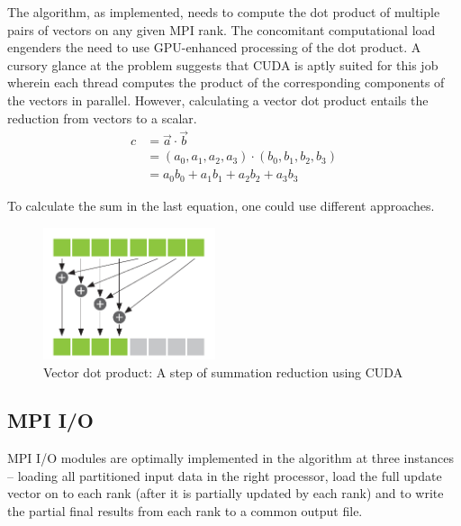 \documentclass[sigplan,screen]{acmart}
\begin{document}
The algorithm, as implemented, needs to compute the dot product of multiple pairs of vectors on any given MPI rank. The concomitant computational load engenders the need to use GPU-enhanced processing of the dot product. A cursory glance at the problem suggests that CUDA is aptly suited for this job wherein each thread computes the product of the corresponding components of the vectors in parallel. However, calculating a vector dot product entails the reduction from vectors to a scalar.  
\begin{align}
c &= \vec{a} \cdot \vec{b} \\
&= (a_0,a_1,a_2,a_3)\cdot(b_0,b_1,b_2,b_3) \\
&= a_0b_0 + a_1b_1 + a_2b_2 + a_3b_3
\end{align}

To calculate the sum in the last equation, one could use different approaches. 

\begin{figure}[h!]
	\begin{center}
		\includegraphics[width=0.45\textwidth]{plots/reduction.png}
	\end{center}
	\caption{Vector dot product: A step of summation reduction using CUDA \cite{spvm}}
	\label{spvm} 
\end{figure}




\subsection{MPI I/O}
MPI I/O modules are optimally implemented in the algorithm at three instances -- loading all partitioned input data in the right processor, load the full update vector on to each rank (after it is partially updated by each rank) and to write the partial final results from each rank to a common output file.
\end{document}
